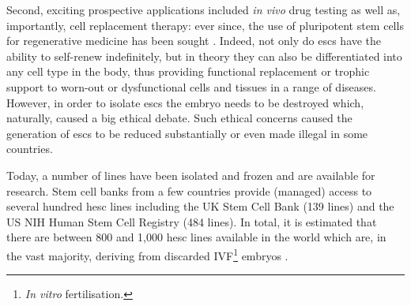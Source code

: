 Second, exciting prospective applications included \textit{in vivo} drug testing as well as, importantly, cell replacement therapy: ever since, the use of pluripotent stem cells for regenerative medicine has been sought \cite{kimbrel2015current}.
Indeed, not only do \glspl{esc} have the ability to self-renew indefinitely, but in theory they can also be differentiated into any cell type in the body, thus providing functional replacement or trophic support to worn-out or dysfunctional cells and tissues in a range of diseases. 
\\

However, in order to isolate \glspl{esc} the embryo needs to be destroyed which, naturally, caused a big ethical debate.
Such ethical concerns caused the generation of \glspl{esc} to be reduced substantially or even made illegal in some countries.

Today, a number of lines have been isolated and frozen and are available for research.
Stem cell banks from a few countries provide (managed) access to several hundred \gls{hesc} lines including the UK Stem Cell Bank (139 lines) and the US NIH Human Stem Cell Registry (484 lines).
In total, it is estimated that there are between 800 and 1,000 \gls{hesc} lines available in the world which are, in the vast majority, deriving from discarded IVF\footnote{\textit{In vitro} fertilisation.} embryos \cite{isasi2009governing}.\\








